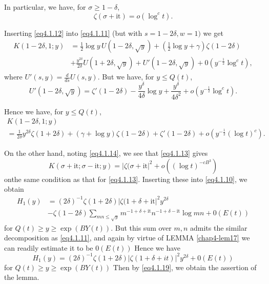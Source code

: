 In particular, we have, for $\sigma \geq 1 - \delta$,
\begin{equation*}
\zeta (\sigma + \text {it}) = o (\log^c t). \tag{4.1.14}\label{eq4.1.14}
\end{equation*}

Inserting \eqref{eq4.1.12} into \eqref{eq4.1.11} (but with $s =1 - 2
\delta, w = 1)$ we get  
\begin{align*}
  K(1-2 \delta, 1; y) & = \frac{1}{2} \log y \,U (1-2 \delta, \sqrt{y})
  + \left(\frac{1}{2} \log y + \gamma \right) \zeta (1-2 \delta )\\ 
  & + \frac{y^{2 \delta}}{2 \delta} U (1+2 \delta, \sqrt{y}) 
  + U' (1-2 \delta, \sqrt{y}) + 0 (y^{- \frac{1}{2}} \log^c t),
\end{align*}
where $U' (s, y) = \frac{d}{ds} U(s, y)$. But we have, for $y \leq Q(t)$,
$$
U' (1-2 \delta, \sqrt{y}) = \zeta ' (1-2 \delta) - \frac{y^ \delta}{4
  \delta} \log y + \frac{y ^ \delta}{4 \delta^2} + o (y ^{-
  \frac{1}{2}} \log^c t). 
$$

Hence we have, for $y \leq Q (t)$,
\begin{multline*}
  K(1- 2 \delta, 1; y) \\
  = \frac{1}{2 \delta} y^{2 \delta} \zeta (1+2 \delta) + (\gamma + \log
  y) \zeta (1-2 \delta) + \zeta ' (1-2 \delta) + o(y^{- \frac{1}{2}}
  (\log t)^c). 
\end{multline*}

On the other hand, noting \eqref{eq4.1.14}, we see that \eqref{eq4.1.13} gives
$$
K(\sigma + \text{it}; \sigma - \text{it}; y) = | \zeta (\sigma +
\text{it} |^2 + o(( \log 
t)^{-c B^3}) 
$$
on\pageoriginale the same condition as that for
\eqref{eq4.1.13}. Inserting these into 
\eqref{eq4.1.10}, we obtain 
\begin{align*}
  H_1 (y) & = (2 \delta)^{- 1} \zeta (1+2 \delta) | \zeta (1+ \delta +
  \text {it} |^2 y^{2 \delta}\\ 
  & - \zeta (1-2 \delta ) \sum_{mn \leq \sqrt{y}} m^{-1 + \delta +
    \text{it}} n^{-1 + \delta - \text{it}} \log mn + 0 (E (t)) 
\end{align*}
for $Q (t) \geq y \geq \exp (BY(t))$. But this sum over $m, n$ admits
the similar decomposition as \eqref{eq4.1.11}, and again by virtue of LEMMA
\ref{chap4-lem17} we can readily estimate it to be $0 (E(t))$ Hence we have 
$$
H_1 (y) = (2 \delta)^{-1} \zeta(1+ 2 \delta) | \zeta (1+ \delta + it)
|^2 y^{2 \delta} + 0(E(t)) 
$$
for $Q(t) \geq y \geq \exp (BY (t))$ Then by \eqref{eq4.1.19}, we obtain the
assertion of the lemma. 

